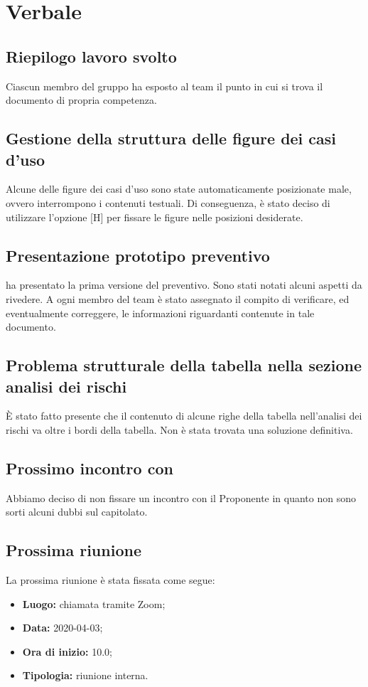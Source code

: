 \section{Verbale}
	
	\subsection{Riepilogo lavoro svolto}
		Ciascun membro del gruppo ha esposto al team il punto in cui si trova il documento di propria competenza.

	\subsection{Gestione della struttura delle figure dei casi d'uso}
		Alcune delle figure dei casi d'uso sono state automaticamente posizionate male, ovvero interrompono i contenuti testuali. Di conseguenza, è stato deciso di utilizzare l'opzione [H] per fissare le figure nelle posizioni desiderate.

	\subsection{Presentazione prototipo preventivo}
		\MP{} ha presentato la prima versione del preventivo. Sono stati notati alcuni aspetti da rivedere. A ogni membro del team è stato assegnato il compito di verificare, ed eventualmente correggere, le informazioni riguardanti contenute in tale documento.
		
	\subsection{Problema strutturale della tabella nella sezione analisi dei rischi}
		È stato fatto presente che il contenuto di alcune righe della tabella nell'analisi dei rischi va oltre i bordi della tabella. Non è stata trovata una soluzione definitiva. 

	\subsection{Prossimo incontro con \Proponente{}}
	    Abbiamo deciso di non fissare un incontro con il Proponente in quanto non sono sorti alcuni dubbi sul capitolato. 

	\subsection{Prossima riunione}
		La prossima riunione è stata fissata come segue: 
		\begin{itemize}
			\item \textbf{Luogo: } chiamata tramite Zoom; 
			\item \textbf{Data: } 2020-04-03; 
			\item \textbf{Ora di inizio: } 10.0;
			\item \textbf{Tipologia: } riunione interna.
		\end{itemize}